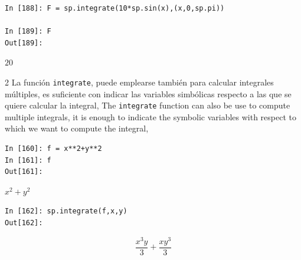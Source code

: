 \begin{center}
	\begin{minipage}{.5\textwidth}
	\begin{verbatim}
In [188]: F = sp.integrate(10*sp.sin(x),(x,0,sp.pi))

In [189]: F
Out[189]:   
		\end{verbatim}
		$20$
	\end{minipage}
\end{center}
\begin{paracol}{2}
	La función \texttt{integrate}, puede emplearse también para calcular integrales múltiples, es suficiente con indicar las variables simbólicas respecto a las que se quiere calcular la integral,
	\switchcolumn
	The \texttt{integrate} function can also be use to compute multiple integrals, it is enough to indicate the symbolic variables with respect to which we want to compute the integral,
\end{paracol}

\begin{center}
	\begin{minipage}{.5\textwidth}
		\begin{verbatim}
In [160]: f = x**2+y**2
In [161]: f
Out[161]: 
		\end{verbatim}
		$x^2+y^2$
		\begin{verbatim}
In [162]: sp.integrate(f,x,y)
Out[162]: 
		\end{verbatim}
		\begin{equation*}
			\frac{x^3y}{3}+\frac{xy^3}{3}
		\end{equation*}
	\end{minipage}
\end{center}

